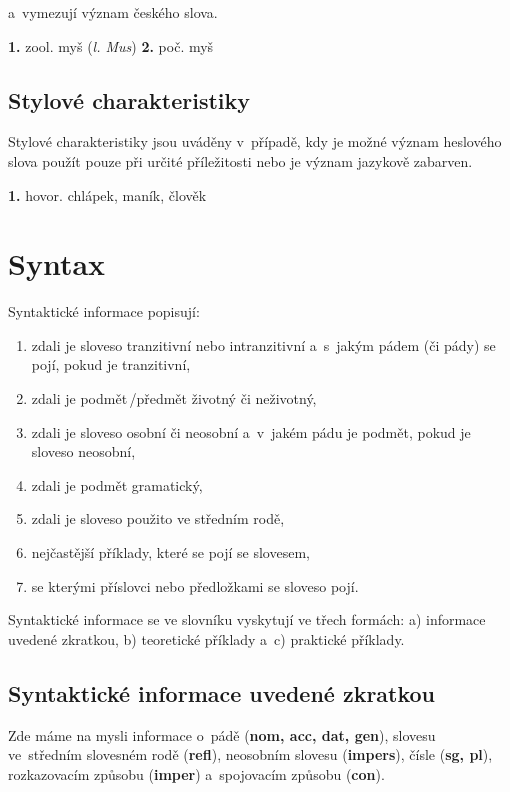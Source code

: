 a~vymezují význam českého slova.

\blspace
  \dicEntry {}   {\textbf{1.}} {\footnotesize{zool.}} {myš} (\textit{l. Mus}) {\textbf{2.}} {\footnotesize{poč.}} {myš}
\blspace

\subsection*{Stylové charakteristiky}

Stylové charakteristiky jsou uváděny v~případě, kdy je možné význam heslového slova použít pouze při určité příležitosti nebo je význam jazykově zabarven.

\blspace
  \dicEntry {}   {\textbf{1.}} {\footnotesize{hovor.}} {chlápek, maník, člověk}
\blspace

\section{Syntax}

Syntaktické informace popisují:

\begin{enumerate}
\item zdali je sloveso tranzitivní nebo intranzitivní a~s~jakým pádem (či pády) se pojí, pokud je tranzitivní,
\item zdali je podmět\,/\addthin předmět životný či neživotný,
\item zdali je sloveso osobní či neosobní a~v~jakém pádu je podmět, pokud je sloveso neosobní,
\item zdali je podmět gramatický,
\item zdali je sloveso použito ve středním rodě,
\item nejčastější příklady, které se pojí se slovesem,
\item se kterými příslovci nebo předložkami se sloveso pojí.
\end{enumerate}

Syntaktické informace se ve slovníku vyskytují ve třech formách: a) informace uvedené zkratkou, b) teoretické příklady a~c) praktické příklady.

\subsection*{Syntaktické informace uvedené zkratkou}

Zde máme na mysli informace o~pádě (\textbf{nom, acc, dat, gen}), slovesu ve~středním slovesném rodě (\textbf{refl}), neosobním slovesu (\textbf{impers}), čísle (\textbf{sg, pl}), rozkazovacím způsobu (\textbf{imper}) a~spojovacím způsobu (\textbf{con}).

